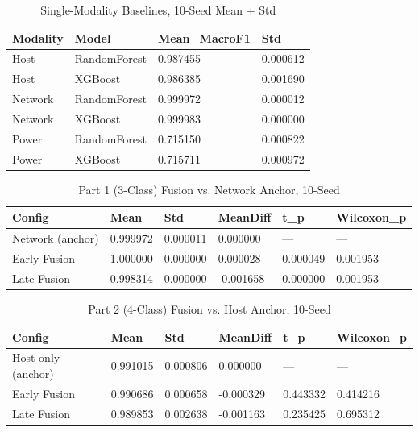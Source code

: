 \begin{table}[htbp]
\caption{Single-Modality Baselines, 10-Seed Mean $\pm$ Std}
\label{tab:j1}
\centering
\footnotesize
\begin{tabular}{llll}
\hline
\textbf{Modality} & \textbf{Model} & \textbf{Mean_MacroF1} & \textbf{Std} \\
\hline
Host & RandomForest & 0.987455 & 0.000612 \\
Host & XGBoost & 0.986385 & 0.001690 \\
Network & RandomForest & 0.999972 & 0.000012 \\
Network & XGBoost & 0.999983 & 0.000000 \\
Power & RandomForest & 0.715150 & 0.000822 \\
Power & XGBoost & 0.715711 & 0.000972 \\
\hline
\end{tabular}
\end{table}

\begin{table}[htbp]
\caption{Part 1 (3-Class) Fusion vs. Network Anchor, 10-Seed}
\label{tab:j2}
\centering
\footnotesize
\begin{tabular}{llllll}
\hline
\textbf{Config} & \textbf{Mean} & \textbf{Std} & \textbf{MeanDiff} & \textbf{t_p} & \textbf{Wilcoxon_p} \\
\hline
Network (anchor) & 0.999972 & 0.000011 & 0.000000 & --- & --- \\
Early Fusion & 1.000000 & 0.000000 & 0.000028 & 0.000049 & 0.001953 \\
Late Fusion & 0.998314 & 0.000000 & -0.001658 & 0.000000 & 0.001953 \\
\hline
\end{tabular}
\end{table}

\begin{table}[htbp]
\caption{Part 2 (4-Class) Fusion vs. Host Anchor, 10-Seed}
\label{tab:j3}
\centering
\footnotesize
\begin{tabular}{llllll}
\hline
\textbf{Config} & \textbf{Mean} & \textbf{Std} & \textbf{MeanDiff} & \textbf{t_p} & \textbf{Wilcoxon_p} \\
\hline
Host-only (anchor) & 0.991015 & 0.000806 & 0.000000 & --- & --- \\
Early Fusion & 0.990686 & 0.000658 & -0.000329 & 0.443332 & 0.414216 \\
Late Fusion & 0.989853 & 0.002638 & -0.001163 & 0.235425 & 0.695312 \\
\hline
\end{tabular}
\end{table}